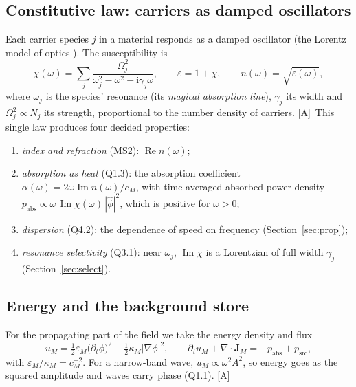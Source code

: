\documentclass[11pt,a4paper]{article}
\numberwithin{equation}{section}
\theoremstyle{definition}
\theoremstyle{plain}
\theoremstyle{remark}
\newcommand{\cM}{c_{M}}
\newcommand{\ii}{\mathrm i}
\newcommand{\abs}[1]{\left\lvert #1\right\rvert}
\newcommand{\tagA}{\textcolor{tag}{\textsf{[A]}}}
\begin{document}
\subsection{Constitutive law: carriers as damped oscillators}\label{sec:lorentz}
Each carrier species $j$ in a material responds as a damped oscillator (the Lorentz model of optics \cite{jackson}). The susceptibility is
\begin{equation}\label{eq:lorentz}
\chi(\omega)=\sum_j \frac{\Omega_j^2}{\omega_j^2-\omega^2-\ii\gamma_j\omega},\qquad
\varepsilon=1+\chi,\qquad n(\omega)=\sqrt{\varepsilon(\omega)},
\end{equation}
where $\omega_j$ is the species' resonance (its \emph{magical absorption line}), $\gamma_j$ its width and $\Omega_j^2\propto N_j$ its strength, proportional to the number density of carriers. \tagA\ This single law produces four decided properties:
\begin{enumerate}[label=(\roman*)]
\item \emph{index and refraction} (MS2): $\operatorname{Re}n(\omega)$;
\item \emph{absorption as heat} (Q1.3): the absorption coefficient $\alpha(\omega)=2\omega\operatorname{Im}n(\omega)/\cM$, with time-averaged absorbed power density $p_{\text{abs}}\propto \omega\,\operatorname{Im}\chi(\omega)\,\abs{\hat\phi}^2$, which is positive for $\omega>0$;
\item \emph{dispersion} (Q4.2): the dependence of speed on frequency (Section~\ref{sec:prop});
\item \emph{resonance selectivity} (Q3.1): near $\omega_j$, $\operatorname{Im}\chi$ is a Lorentzian of full width $\gamma_j$ (Section~\ref{sec:select}).
\end{enumerate}

\subsection{Energy and the background store}
For the propagating part of the field we take the energy density and flux
\begin{equation}
u_M = \tfrac12\varepsilon_M\big(\partial_t\phi\big)^2 + \tfrac12\kappa_M\abs{\nabla\phi}^2,\qquad
\partial_t u_M + \nabla\cdot\bm J_M = -p_{\text{abs}} + p_{\text{src}},
\end{equation}
with $\varepsilon_M/\kappa_M = \cM^{-2}$. For a narrow-band wave, $u_M\propto \omega^2 A^2$, so energy goes as the squared amplitude and waves carry phase (Q1.1). \tagA
\end{document}
